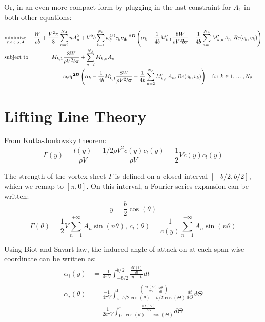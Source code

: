 \documentclass[letterpaper,12pt]{article}
\begin{document}
Or, in an even more compact form by plugging in the last constraint for $A_1$ in both other equations:

\begin{align*}
	& \underset{V, b, c, \alpha, A}{\text{minimize}} &
	\frac{W}{\rho b} + \frac{V^2 \pi}{8}\sum_{n=2}^{N_A} n A_{n}^2 &+
	  V^2 b  \sum_{k=1}^{N_{\theta}} w_{\theta}^{(k)} c_k \boldsymbol{{c_{d_0}}^{2D}}
	  \left( \alpha_k
	  - \frac {1}{4b} M'_{k,1}\frac{8W}{\rho V^2 b \pi}
	  - \frac {1}{4b}\sum_{n=1}^{N_{A}}M'_{k,n}A_n , Re(c_k, v_k)
	  \right)\\
	& \text{subject to} &
 	M_{k, 1} \frac{8W}{\rho V^2 b \pi} &+ \sum_{n=2}^{N_{A}} M_{k,n} A_n = \\
	& & c_k\boldsymbol{{c_l}^{2D}} & \left( \alpha_k
		 - \frac {1}{4b} M'_{k,1}\frac{8W}{\rho V^2 b \pi}
		 - \frac {1}{4b}\sum_{n=2}^{N_{A}}M'_{k,n}A_n , Re(c_k, v_k)\right)
		 \quad \text{for } k \in 1,\dots, N_{\theta}
\end{align*}

\section{Lifting Line Theory}

From Kutta-Joukovsky theorem:
%
$$\Gamma(y) = \frac{l(y)}{\rho V} = \frac{1/2 \rho V^2 c(y) c_l(y)}{\rho V} =  \frac{1}{2} V c(y) c_l(y)$$

The strength of the vortex sheet $\Gamma$ is defined on a closed interval $[-b/2, b/2]$, which we remap to $[\pi, 0]$. 
On this interval, a Fourier series expansion can be written:
$$y = \frac{b}{2}\cos(\theta)$$
%
$$\Gamma(\theta) = \frac{1}{2} V\sum_{n=1}^{+\infty} A_n \sin(n\theta) \text{,      } c_l(\theta) = \frac 1 {c(y)} \sum_{n=1}^{+\infty} A_n \sin(n\theta)$$

Using Biot and Savart law, the induced angle of attack on at each span-wise coordinate can be written as:
%
	\begin{align*}
		\alpha_i(y) &= \frac{-1}{4\pi V}\int_{-b/2}^{b/2} \frac{\frac{d\Gamma(t)}{dt}}{y-t} dt \\ 
		\alpha_i(\theta) &= \frac{-1}{4\pi V} \int_{\pi}^{0} \frac{\left( \frac{d\Gamma(\Theta)}{d\Theta} \frac{d\Theta}{dt}\right)}{b/2\cos(\theta)-b/2\cos(\Theta)}\frac{dt}{d\Theta} d\Theta	 \\
				 &= \frac{1}{2b\pi V} \int_{0}^{\pi} \frac{\frac{d\Gamma(\Theta)}{d\Theta}}{\cos(\theta)-\cos(\Theta)} d\Theta	
	\end{align*}
\end{document}
